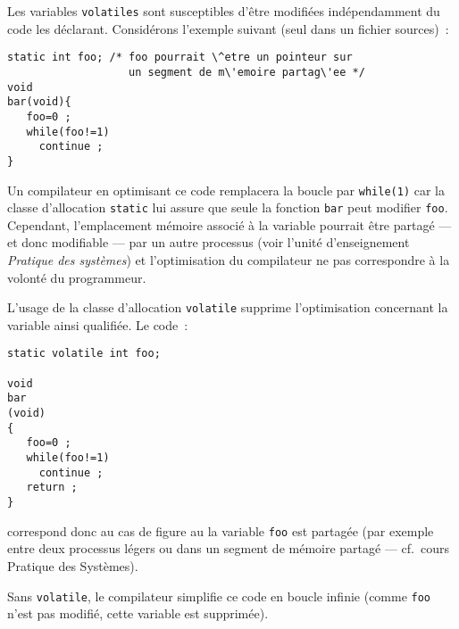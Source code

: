 \begin{frame}[fragile]
  Les variables \texttt{volatiles} sont susceptibles d'\^etre
  modifi\'ees ind\'ependamment du code les d\'eclarant. Consid\'erons
  l'exemple suivant (seul dans un fichier sources)~:
\begin{verbatim}
static int foo; /* foo pourrait \^etre un pointeur sur 
                   un segment de m\'emoire partag\'ee */
void 
bar(void){
   foo=0 ;
   while(foo!=1)
     continue ;
}
\end{verbatim}
  Un compilateur en optimisant ce code remplacera la boucle par
  \verb+while(1)+ car la classe d'allocation \texttt{static} lui
  assure que seule la fonction \texttt{bar} peut modifier
  \texttt{foo}. Cependant, l'emplacement m\'emoire associ\'e \`a la
  variable pourrait \^etre partag\'e --- et donc modifiable --- par un
  autre processus (voir l'unit\'e d'enseignement \emph{Pratique des
    syst\`emes}) et l'optimisation du compilateur ne pas correspondre
  \`a la volont\'e du programmeur.
\end{frame}
\begin{frame}[fragile]
  L'usage de la classe d'allocation \texttt{volatile} supprime
  l'optimisation concernant la variable ainsi qualifi\'ee. Le code~:
\begin{verbatim}
static volatile int foo;

void 
bar
(void)
{
   foo=0 ;
   while(foo!=1)
     continue ;
   return ;
}
\end{verbatim}
  correspond donc au cas de figure au la variable \texttt{foo} est
  partag\'ee (par exemple entre deux processus l\'egers ou dans un segment
  de m\'emoire partag\'e --- cf.\ cours Pratique des Syst\`emes).
  \par\medskip
  Sans \texttt{volatile}, le compilateur simplifie ce code en boucle infinie (comme
  \texttt{foo} n'est pas modifi\'e, cette variable est supprim\'ee).
\end{frame}
